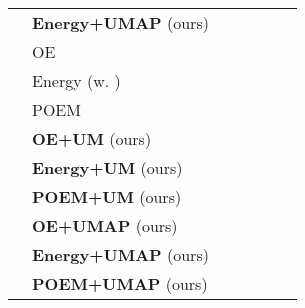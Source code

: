 \documentclass{article}
\theoremstyle{plain}
\theoremstyle{definition}
\theoremstyle{remark}
\begin{document}
\begin{table}[h!]
{\begin{tabular}{c|l|ccccc}
         & \textbf{Energy+UMAP} (ours) &  &  &  &  & \\
         \cmidrule{2-7}
         & OE\citep{hendrycks2018deep} &  &  &  &  & \\
         & Energy (w. )\citep{liu2020energy} &  &  &  &  & \\
& POEM\citep{ming2022poem}  &  &  &  &  & \\
         & \textbf{OE+UM} (ours) & &  &  &  &  \\
         & \textbf{Energy+UM} (ours) &  &  &  &  & \\
         & \textbf{POEM+UM} (ours) &  &  &  &  & \\
         & \textbf{OE+UMAP} (ours) &  &  &  &  & \\
         & \textbf{Energy+UMAP} (ours) &  &  &  &  & \\
         & \textbf{POEM+UMAP} (ours) &  &  &  &  & \\
        \bottomrule[1.5pt]
    \end{tabular}}
    \label{tab:my_label_complete}
\end{table}
\end{document}
